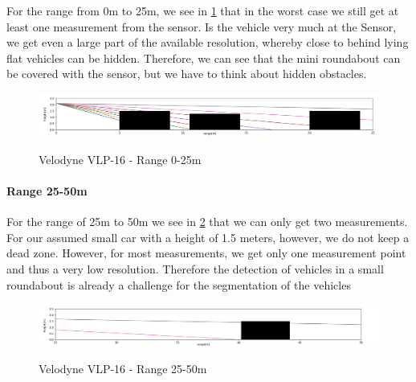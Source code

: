 \documentclass[11pt,oneside,openright]{mpreport}
\begin{document}
For the range from 0m to 25m, we see in \cref{velodyne_range_25} that in the worst case we still get at least one measurement from the sensor. Is the vehicle very much at the
Sensor, we get even a large part of the available resolution, whereby close to behind lying flat vehicles can be hidden. Therefore, we can see 
that the mini roundabout can be covered with the sensor, but we have to think about hidden obstacles.

\begin{figure}[!ht]
\caption{Velodyne VLP-16 - Range 0-25m}
\includegraphics[width=\textwidth]{bilder/range_25.png}
\label{velodyne_range_25}
\end{figure}

\paragraph{Range 25-50m}

For the range of 25m to 50m we see in \cref{velodyne_range_50} that we can only get two measurements. For our assumed small car with a height of 1.5 meters,
however, we do not keep a dead zone. However, for most measurements, we get only one measurement point and thus a very low resolution.
Therefore the detection of vehicles in a small roundabout is already a challenge for the segmentation of the vehicles

\begin{figure}[!ht]
\caption{Velodyne VLP-16 - Range 25-50m}
\includegraphics[width=\textwidth]{bilder/range_50.png}
\label{velodyne_range_50}
\end{figure}
\end{document}
